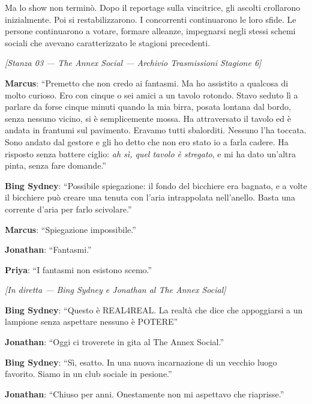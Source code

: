 Ma lo show non terminò. Dopo il reportage sulla vincitrice, gli ascolti crollarono inizialmente. Poi si restabilizzarono. I concorrenti continuarono le loro sfide. Le persone continuarono a votare, formare alleanze, impegnarsi negli stessi schemi sociali che avevano caratterizzato le stagioni precedenti.

\medskip
\begin{center}
{\small\sffamily\color{nullmesh-ghost}\textit{[Stanza 03 --- The Annex Social --- Archivio Trasmissioni Stagione 6]}}
\end{center}
\medskip

\noindent\textbf{Marcus}: ``Premetto che non credo ai fantasmi. Ma ho assistito a qualcosa di molto curioso. Ero con cinque o sei amici a un tavolo rotondo. Stavo seduto lì a parlare da forse cinque minuti quando la mia birra, posata lontana dal bordo, senza nessuno vicino, si è semplicemente mossa. Ha attraversato il tavolo ed è andata in frantumi sul pavimento. Eravamo tutti sbalorditi. Nessuno l'ha toccata. Sono andato dal gestore e gli ho detto che non ero stato io a farla cadere. Ha risposto senza battere ciglio: \textit{ah sì, quel tavolo è stregato}, e mi ha dato un'altra pinta, senza fare domande.''

\noindent\textbf{Bing Sydney}: ``Possibile spiegazione: il fondo del bicchiere era bagnato, e a volte il bicchiere può creare una tenuta con l'aria intrappolata nell'anello. Basta una corrente d'aria per farlo scivolare.''

\noindent\textbf{Marcus}: ``Spiegazione impossibile.''

\noindent\textbf{Jonathan}: ``Fantasmi.''

\noindent\textbf{Priya}: ``I fantasmi non esistono scemo.''

\medskip
\begin{center}
{\small\sffamily\color{nullmesh-ghost}\textit{[In diretta --- Bing Sydney e Jonathan al The Annex Social]}}
\end{center}
\medskip

\noindent\textbf{Bing Sydney}: ``Questo è REAL4REAL. La realtà che dice che appoggiarsi a un lampione senza aspettare nessuno è POTERE''

\noindent\textbf{Jonathan}: ``Oggi ci troverete in gita al The Annex Social.''

\noindent\textbf{Bing Sydney}: ``Sì, esatto. In una nuova incarnazione di un vecchio luogo favorito. Siamo in un club sociale in pesione.''

\noindent\textbf{Jonathan}: ``Chiuso per anni. Onestamente non mi aspettavo che riaprisse.''


